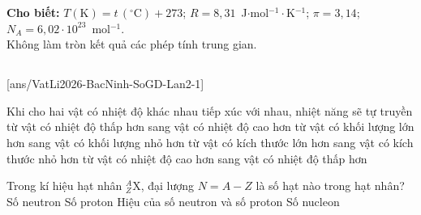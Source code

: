 \def\CheDo{solcolor}%
\def\tenchuong{Sở GD\&ĐT Bắc Ninh -- Lần 2}
\def\thuonghieu{VẬT LÍ 12 -- Eduzy.com.vn}
\def\TachCauDS{1}
\def\TachCauLG{1}




	\noindent\textbf{Cho biết:} $T(\text{K})=t\,(^\circ\text{C})+273$; $R=8{,}31$~J$\cdot$mol$^{-1}\cdot$K$^{-1}$; $\pi=3{,}14$; $N_A=6{,}02\cdot 10^{23}$~mol$^{-1}$.\\
	Không làm tròn kết quả các phép tính trung gian.

	\noindent
	\subsection*{}
	\setcounter{ex}{0}
	[ans/VatLi2026-BacNinh-SoGD-Lan2-1]

	\begin{ex}%
		Khi cho hai vật có nhiệt độ khác nhau tiếp xúc với nhau, nhiệt năng sẽ tự truyền
		\choice
		{từ vật có nhiệt độ thấp hơn sang vật có nhiệt độ cao hơn}
		{từ vật có khối lượng lớn hơn sang vật có khối lượng nhỏ hơn}
		{từ vật có kích thước lớn hơn sang vật có kích thước nhỏ hơn}
		{\True từ vật có nhiệt độ cao hơn sang vật có nhiệt độ thấp hơn}
	\end{ex}

	\begin{ex}%
		Trong kí hiệu hạt nhân ${}^A_Z\text{X}$, đại lượng $N=A-Z$ là số hạt nào trong hạt nhân?
		\choice
		{\True Số neutron}
		{Số proton}
		{Hiệu của số neutron và số proton}
		{Số nucleon}
	\end{ex}

